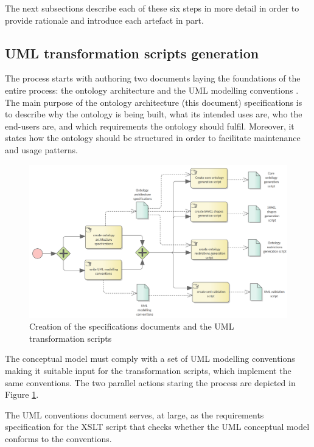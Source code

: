 	The next subsections describe each of these six steps in more detail in order to provide rationale and introduce each artefact in part.
	
	\subsection{UML transformation scripts generation}
	\label{sec:uml-transformation}
	
	The process starts with authoring two documents laying the foundations of the entire process: the ontology architecture and the UML modelling conventions \citep{costetchi2020b}. The main purpose of the ontology architecture (this document) specifications is to describe why the ontology is being built, what its intended uses are, who the end-users are, and which requirements the ontology should fulfil. Moreover, it states how the ontology should be structured in order to facilitate maintenance and usage patterns.
	
	
	\begin{figure}[!ht]		
		\centering
		\includegraphics[width=\textwidth]{../img/uml2formalScriptCreation.png}
		\caption{Creation of the specifications documents and the UML transformation scripts}
		\label{fig:uml-transformation}
	\end{figure}
	
	The conceptual model must comply with a set of UML modelling conventions making it suitable input for the transformation scripts, which implement the same conventions. The two parallel actions staring the process are depicted in Figure \ref{fig:uml-transformation}.
		
	The UML conventions document serves, at large, as the requirements specification for the XSLT script that checks whether the UML conceptual model conforms to the conventions.
	
